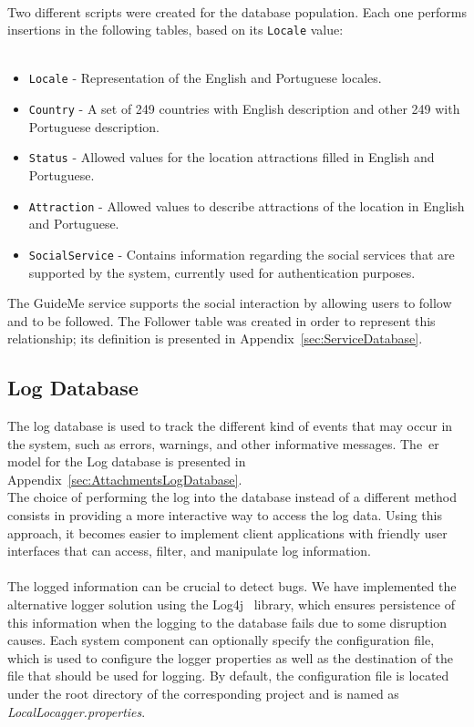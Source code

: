 \\
Two different scripts were created for the database population. Each one performs insertions in the following tables, based on its \verb"Locale" value:\\
\\
\begin{itemize}
   \item \verb"Locale" - Representation of the English and Portuguese locales.
   \item \verb"Country" - A set of 249 countries with English description and other 249 with Portuguese description.
   \item \verb"Status" - Allowed values for the location attractions filled in English and Portuguese.
   \item \verb"Attraction" - Allowed values to describe attractions of the location in English and Portuguese.
   \item \verb"SocialService" - Contains information regarding the social services that are supported by the system, currently used for authentication purposes.
\end{itemize}
The GuideMe service supports the social interaction by allowing users to follow and to be followed. The Follower table was created in order to represent this relationship; its definition is presented in Appendix~\ref{sec:ServiceDatabase}.
\subsection{Log Database}
\label{sec:LogDataBaseModel}
The log database is used to track the different kind of events that may occur in the system, such as errors, warnings, and other informative messages. The~\gls{er} model for the Log database is presented in Appendix~\ref{sec:AttachmentsLogDatabase}.
\\
The choice of performing the log into the database instead of a different method consists in providing a more interactive way to access the log data. Using this approach, it becomes easier to implement client applications with friendly user interfaces that can access, filter, and manipulate log information.\\
\\
The logged information can be crucial to detect bugs. We have implemented the alternative logger solution using the Log4j~\cite{apacheLog4j} library, which ensures persistence of this information when the logging to the database fails due to some disruption causes. Each system component can optionally specify the configuration file, which is used to configure the logger properties as well as the destination of the file that should be used for logging. By default, the configuration file is located under the root directory of the corresponding project and is named as \emph{LocalLocagger.properties}.

